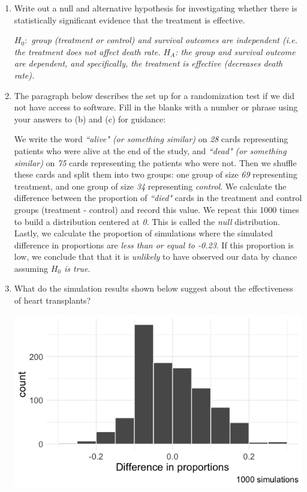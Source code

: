 \documentclass[12pt]{article}   	%
\newcommand{\soln}[2]{\textit{\textcolor{custom_red}{#2}}}{}
\begin{document}
\begin{enumerate}
\begin{enumerate}
  \item
    Write out a null and alternative hypothesis for investigating
    whether there is statistically significant evidence that the
    treatment is effective.
    
    \soln{}{$H_{0}:$  group (treatment or control) and survival outcomes are independent (i.e. the treatment does not affect death rate. $H_{A}$: the group and survival outcome are dependent, and specifically, the treatment is effective (decreases death rate).}
  \item
    The paragraph below describes the set up for a randomization test if
    we did not have access to software. Fill in the blanks with a number
    or phrase using your answers to (b) and (c) for guidance:

    We write the word \soln{}{``alive" (or something similar)} on  \soln{}{28} cards representing
    patients who were alive at the end of the study, and \soln{}{``dead" (or something similar)} on
    \soln{}{75} cards representing the patients who were not. Then we
    shuffle these cards and split them into two groups: one group of
    size \soln{}{69} representing treatment, and one group of size
    \soln{}{34} representing \soln{}{control}. We calculate the
    difference between the proportion of \soln{}{``died"} cards in the
    treatment and control groups (treatment - control) and record this
    value. We repeat this 1000 times to build a distribution centered at
   \soln{}{0}. This is called the  \soln{}{null} distribution.
    Lastly, we calculate the proportion of simulations where the
    simulated difference in proportions are  \soln{}{less than or equal to -0.23}. If this
    proportion is low, we conclude that that it is \soln{}{unlikely}
    to have observed our data by chance assuming \soln{}{$H_0$ is true}.
    
  \item
    What do the simulation results shown below suggest about the
    effectiveness of heart transplants?

    \includegraphics[scale=0.4]{images/14-heart-transplant-null.png}
    

\end{enumerate}
\end{enumerate}
\end{document}
